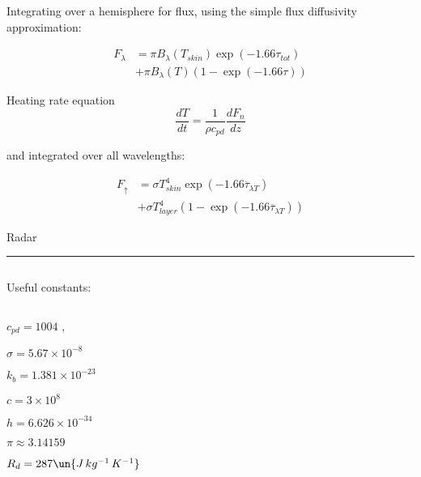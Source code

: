 \documentclass[12pt]{article}
\begin{document}
\begin{multicols}{2}
    
\noindent
Integrating over a hemisphere for flux, using the simple flux diffusivity approximation:

\begin{align}
  F_\lambda &= \pi B_\lambda(T_{skin}) \exp(-1.66 \tau_{tot}) \nonumber \\
  & +   \pi B_\lambda(T)(1 - \exp(-1.66 \tau))
\end{align}


\noindent
Heating rate equation
\begin{equation}
  \label{eq:fluxdiv}
  \frac{dT}{dt} = \frac{1}{\rho c_{pd}} \frac{dF_n}{dz}
\end{equation}

\noindent
and integrated over all wavelengths:

     \begin{align}
       \label{eq:constantT}
       F_{\uparrow} &= \sigma T_{skin}^4 \exp( -1.66 \overline{\tau}_{\lambda T}  ) \nonumber \\
       & + \sigma T_{layer}^4(1- \exp( -1.66 \overline{\tau}_{\lambda T} ))
     \end{align}

\noindent
Radar


\rule{3cm}{.1mm}



$~$

\noindent
Useful constants:

$~$

$c_{pd}=1004$ , 

$\sigma=5.67 \times  10^{-8}$ 

$k_b = 1.381  \times 10^{-23}$  

$c=3 \times 10^{8}$ 

$h=6.626 \times 10^{-34}$ 

$\pi \approx 3.14159$

 $R_d=287 \un{J\,kg^{-1}\,K^{-1}}$


\end{multicols}
\end{document}
